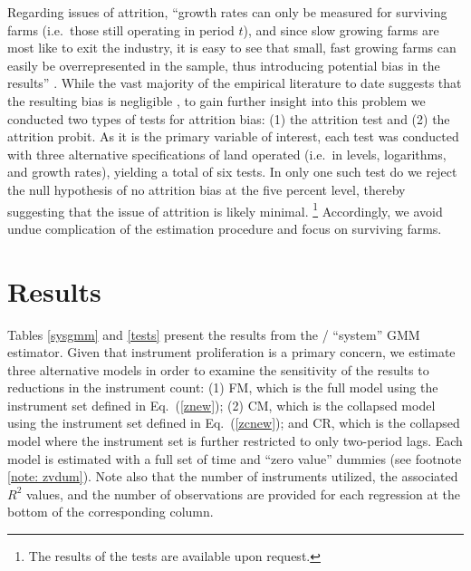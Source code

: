 \documentclass[english]{article}
\begin{document}
Regarding issues of attrition, ``growth rates can only be measured for 
surviving farms (i.e.\ those still operating in period $t$), and since slow 
growing farms are most like to exit the industry, it is easy to see that small, 
fast growing farms can easily be overrepresented in the sample, thus 
introducing potential bias in the results'' \citep[pg.\ 790]{bakucs2009}. 
While the vast majority of the empirical literature to date suggests that the 
resulting bias is negligible \citep{evans1987, hall1987, weiss1999, dries2004},
to gain further insight into this problem we conducted two types of tests for
attrition bias: (1) the \citet{becketti1988} attrition test and (2) the 
\citet{fitzgerald1998} attrition probit.
As it is the primary variable of interest, each test was conducted with three 
alternative specifications of land operated (i.e.\ in levels, logarithms, and 
growth rates), yielding a total of six tests.
In only one such test do we reject the null hypothesis of no attrition bias at 
the five percent level, thereby suggesting that the issue of attrition is likely 
minimal.%
\footnote{The results of the tests are available upon request.}
Accordingly, we avoid undue complication of the estimation procedure 
and focus on surviving farms.


\section{Results}
\label{sec: results}

Tables \ref{sysgmm} and \ref{tests} present the results from the 
\citet{arellano1995}/\citet{blundell1998} ``system'' GMM estimator. 
Given that instrument proliferation is a primary concern, we estimate 
three alternative models in order to examine the sensitivity of the results 
to reductions in the instrument count: (1) FM, which is the full model using 
the instrument set defined in Eq.\ (\ref{znew}); (2) CM, which is the 
collapsed model using the instrument set defined in Eq.\ (\ref{zcnew}); 
and CR, which is the collapsed model where the instrument set is further 
restricted to only two-period lags.
Each model is estimated with a full set of time and ``zero value'' dummies 
(see footnote \ref{note: zvdum}).
Note also that the number of instruments utilized, the associated $R^2$ values, 
and the number of observations are provided for each regression at the 
bottom of the corresponding column. 
\end{document}
